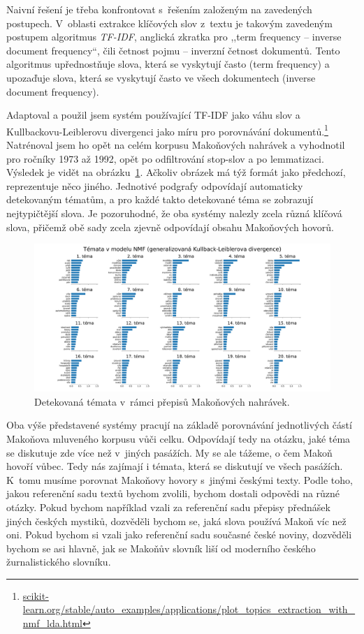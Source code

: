 Naivní řešení je třeba konfrontovat s~řešením založeným na zavedených postupech.
V~oblasti extrakce klíčových slov z~textu je takovým zavedeným postupem
algoritmus \textit{TF-IDF},\cite{Beel2016-11Resea-32348} anglická zkratka pro
,,term frequency -- inverse document frequency``, čili četnost pojmu -- inverzní
četnost dokumentů. Tento algoritmus upřednostňuje slova, která se vyskytují
často (term frequency) a upozaďuje slova, která se vyskytují často ve všech
dokumentech (inverse document frequency).

Adaptoval a použil jsem systém používající TF-IDF jako váhu slov a
Kull\-back\-ovu-Leib\-ler\-ovu divergenci
jako míru pro porovnávání
dokumentů.\footnote{\href{https://scikit-learn.org/stable/auto\_examples/applications/plot\_topics\_extraction\_with\_nmf\_lda.html}{scikit-learn.org/stable/auto\_examples/applications/plot\_topics\_extraction\_with\_nmf\_lda.html}}
Natrénoval jsem ho opět na celém korpusu Makoňových nahrávek a vyhodnotil pro
ročníky 1973 až 1992, opět po odfiltrování stop-slov a po lemmatizaci. Výsledek
je vidět na obrázku~\ref{fig:topic-by-year-kld}. Ačkoliv obrázek má týž formát
jako předchozí, reprezentuje něco jiného. Jednotivé podgrafy odpovídají
automaticky detekovaným tématům, a pro každé takto detekované téma se zobrazují
nejtypičtější slova.
Je pozoruhodné, že oba systémy nalezly zcela různá klíčová slova, přičemž obě
sady zcela zjevně odpovídají obsahu Makoňových hovorů.

\begin{figure}[htpb]
\includegraphics[scale=0.32, angle=90]{rc/topics-by-year-kld.pdf}
\caption{Detekovaná témata v~rámci přepisů Makoňových nahrávek.}
\label{fig:topic-by-year-kld}
\end{figure}

Oba výše představené systémy pracují na základě porovnávání jednotlivých částí
Makoňova mluveného korpusu vůči celku. Odpovídají tedy na otázku, jaké téma se
diskutuje zde více než v~jiných pasážích. My se ale tážeme, o čem Makoň hovoří
vůbec. Tedy nás zajímají i témata, která se diskutují ve všech pasážích. K~tomu
musíme porovnat Makoňovy hovory s~jinými českými texty. Podle toho, jakou
referenční sadu textů bychom zvolili, bychom dostali odpovědi na různé otázky.
Pokud bychom například vzali za referenční sadu přepisy přednášek jiných českých
mystiků, dozvěděli bychom se, jaká slova používá Makoň víc než oni. Pokud bychom
si vzali jako referenční sadu současné české noviny, dozvěděli bychom se asi
hlavně, jak se Makoňův slovník liší od moderního českého žurnalistického
slovníku.

